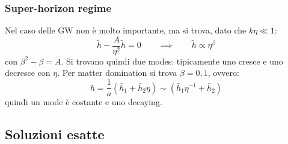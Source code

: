 \subsubsection{Super-horizon regime}

Nel caso delle GW non è molto importante, ma si trova, dato che $ k \eta \ll 1 $:
\begin{equation*}
  \tilde{h} - \frac{A}{\eta^2} \tilde{h} = 0
  \qquad \implies \qquad
  \tilde{h} \propto \eta^\beta
\end{equation*}
con $ \beta^2 - \beta = A $. Si trovano quindi due modes: tipicamente uno cresce e uno decresce con $ \eta $. Per matter domination si trova $ \beta = 0,1 $, ovvero:
\begin{equation*}
  h = \frac{1}{a} (\bar{h}_1 + \bar{h}_2 \eta) \sim (\bar{h}_1 \eta^{-1} + \bar{h}_2)
\end{equation*}
quindi un mode è costante e uno decaying.

\subsection{Soluzioni esatte}


